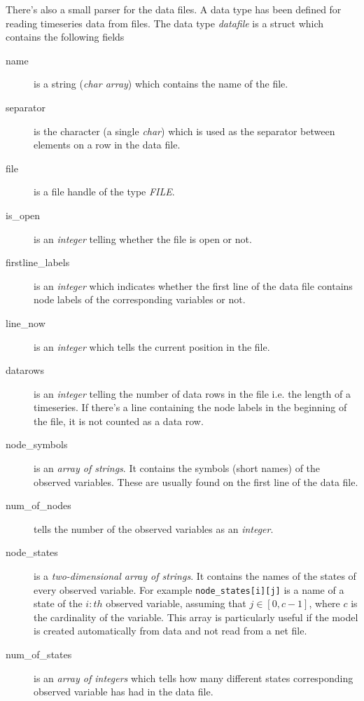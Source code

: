 \documentclass[12pt,a4paper]{report}
\newcommand{\cdatatype}[1]{{\it #1}}
\newcommand{\examplecode}[1]{\texttt{#1}}
\begin{document}
There's also a small parser for the data files. A data type has been
defined for reading timeseries data from files. The data type 
\cdatatype{datafile} is a struct which contains the following fields
\begin{description}
\item[name] is a string (\cdatatype{char array}) which contains the 
name of the file.

\item[separator] is the character (a single \cdatatype{char}) which is used 
as the separator between elements on a row in the data file.

\item[file] is a file handle of the type \cdatatype{FILE}.

\item[is\_open] is an \cdatatype{integer} telling whether the file is open
or not.

\item[firstline\_labels] is an \cdatatype{integer} which indicates whether
the first line of the data file contains node labels of the
corresponding variables or not. 

\item[line\_now] is an \cdatatype{integer} which tells the current position
in the file.

\item[datarows] is an \cdatatype{integer} telling the number of data rows in
the file i.e. the length of a timeseries. If there's a line containing
the node labels in the beginning of the file, it is not counted as a
data row.

\item[node\_symbols] is an \cdatatype{array of strings}. It contains the
symbols (short names) of the observed variables. These are usually
found on the first line of the data file.

\item[num\_of\_nodes] tells the number of the observed variables as an
\cdatatype{integer}.

\item[node\_states] is a \cdatatype{two-dimensional array of
strings}. It contains the names of the states of every observed
variable. For example \examplecode{node\_states[i][j]} is a name of a
state of the $i:th$ observed variable, assuming that $j \in [0, c-1]$, 
where $c$ is the cardinality of the variable. This array is
particularly useful if the model is created automatically from data
and not read from a net file.

\item[num\_of\_states] is an \cdatatype{array of integers} which tells how
many different states corresponding observed variable has had in the
data file.
\end{description}
\end{document}
